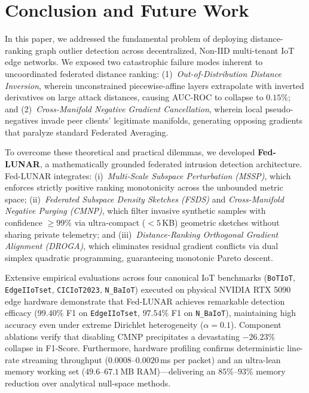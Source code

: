 
\section{Conclusion and Future Work}
\label{sec:conclusion}

In this paper, we addressed the fundamental problem of deploying distance-ranking graph outlier detection across decentralized, Non-IID multi-tenant IoT edge networks. We exposed two catastrophic failure modes inherent to uncoordinated federated distance ranking: (1)~\emph{Out-of-Distribution Distance Inversion}, wherein unconstrained piecewise-affine layers extrapolate with inverted derivatives on large attack distances, causing AUC-ROC to collapse to $0.15\%$; and (2)~\emph{Cross-Manifold Negative Gradient Cancellation}, wherein local pseudo-negatives invade peer clients' legitimate manifolds, generating opposing gradients that paralyze standard Federated Averaging.

To overcome these theoretical and practical dilemmas, we developed \textbf{Fed-LUNAR}, a mathematically grounded federated intrusion detection architecture. Fed-LUNAR integrates: (i)~\emph{Multi-Scale Subspace Perturbation (MSSP)}, which enforces strictly positive ranking monotonicity across the unbounded metric space; (ii)~\emph{Federated Subspace Density Sketches (FSDS)} and \emph{Cross-Manifold Negative Purging (CMNP)}, which filter invasive synthetic samples with confidence $\ge 99\%$ via ultra-compact ($<5$\,KB) geometric sketches without sharing private telemetry; and (iii)~\emph{Distance-Ranking Orthogonal Gradient Alignment (DROGA)}, which eliminates residual gradient conflicts via dual simplex quadratic programming, guaranteeing monotonic Pareto descent.

Extensive empirical evaluations across four canonical IoT benchmarks (\texttt{BoTIoT}, \texttt{EdgeIIoTset}, \texttt{CICIoT2023}, \texttt{N\_BaIoT}) executed on physical NVIDIA RTX 5090 edge hardware demonstrate that Fed-LUNAR achieves remarkable detection efficacy ($99.40\%$ F1 on \texttt{EdgeIIoTset}, $97.54\%$ F1 on \texttt{N\_BaIoT}), maintaining high accuracy even under extreme Dirichlet heterogeneity ($\alpha = 0.1$). Component ablations verify that disabling CMNP precipitates a devastating $-26.23\%$ collapse in F1-Score. Furthermore, hardware profiling confirms deterministic line-rate streaming throughput ($0.0008$--$0.0020$\,ms per packet) and an ultra-lean memory working set ($49.6$--$67.1$\,MB RAM)---delivering an $85\%$--$93\%$ memory reduction over analytical null-space methods.

